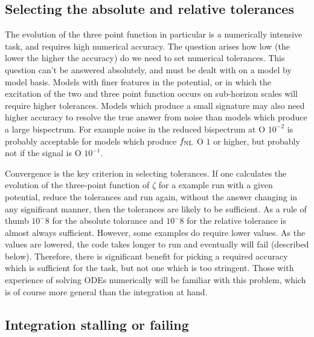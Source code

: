 \documentclass[10pt,
amsmath,amssymb,
aps,prd,nofootinbib,eqsecnum,a4paper]{revtex4}
\begin{document}
\subsection{Selecting the absolute and relative tolerances}

The evolution of the three point function in particular is a numerically intensive task, and requires high numerical 
accuracy. The question arises how low (the lower the higher the accuracy) do we need to set numerical 
tolerances. This question can't be answered absolutely, and must be dealt with on a model by model basis. Models 
with finer features in the potential, or in which the excitation of the two and three point function 
occurs on sub-horizon scales will require higher tolerances. Models which produce a small signature may also need 
higher accuracy to resolve the true answer from noise than models which produce a large bispectrum. For example noise 
in the reduced bispectrum at {\cal O} $10^{-2} $ is probably acceptable for models which produce $f_{\rm NL}$ {\cal O} $1$ or higher, but 
probably not if the signal is {\cal O} $10^{-1} $.

Convergence is the key criterion in selecting tolerances. If one calculates the evolution of the three-point 
function of $\zeta$ for a example run with a given potential, reduce the tolerances and run again, without the answer 
changing in any significant manner, then the tolerances are likely to be sufficient.  As a rule of thumb 
$10^-8$ for the absolute tolorance and $10^-8$ for the relative tolerance is almost always sufficient. 
However, some examples do require lower values. As the values 
are lowered,  the code takes longer to run and eventually will fail (described below). Therefore, 
there is significant benefit for picking a required accuracy which is sufficient for the task, but not one which is too 
stringent. Those with experience of solving ODEs numerically will be familiar with this problem, which is of course 
more general than the integration at hand.

\subsection{Integration stalling or failing} 
\end{document}
